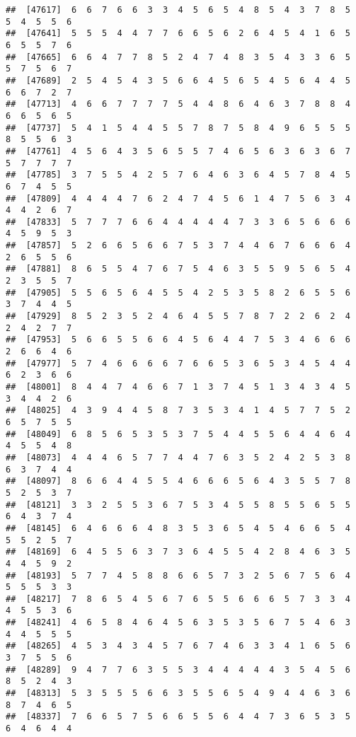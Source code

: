 \documentclass[
]{book}
\begin{document}
\begin{verbatim}
##  [47617]  6  6  7  6  6  3  3  4  5  6  5  4  8  5  4  3  7  8  5  5  4  5  5  6
##  [47641]  5  5  5  4  4  7  7  6  6  5  6  2  6  4  5  4  1  6  5  6  5  5  7  6
##  [47665]  6  6  4  7  7  8  5  2  4  7  4  8  3  5  4  3  3  6  5  5  7  5  6  7
##  [47689]  2  5  4  5  4  3  5  6  6  4  5  6  5  4  5  6  4  4  5  6  6  7  2  7
##  [47713]  4  6  6  7  7  7  7  5  4  4  8  6  4  6  3  7  8  8  4  6  6  5  6  5
##  [47737]  5  4  1  5  4  4  5  5  7  8  7  5  8  4  9  6  5  5  5  8  5  5  6  3
##  [47761]  4  5  6  4  3  5  6  5  5  7  4  6  5  6  3  6  3  6  7  5  7  7  7  7
##  [47785]  3  7  5  5  4  2  5  7  6  4  6  3  6  4  5  7  8  4  5  6  7  4  5  5
##  [47809]  4  4  4  4  7  6  2  4  7  4  5  6  1  4  7  5  6  3  4  4  4  2  6  7
##  [47833]  5  7  7  7  6  6  4  4  4  4  4  7  3  3  6  5  6  6  6  4  5  9  5  3
##  [47857]  5  2  6  6  5  6  6  7  5  3  7  4  4  6  7  6  6  6  4  2  6  5  5  6
##  [47881]  8  6  5  5  4  7  6  7  5  4  6  3  5  5  9  5  6  5  4  2  3  5  5  7
##  [47905]  5  5  6  5  6  4  5  5  4  2  5  3  5  8  2  6  5  5  6  3  7  4  4  5
##  [47929]  8  5  2  3  5  2  4  6  4  5  5  7  8  7  2  2  6  2  4  2  4  2  7  7
##  [47953]  5  6  6  5  5  6  6  4  5  6  4  4  7  5  3  4  6  6  6  2  6  6  4  6
##  [47977]  5  7  4  6  6  6  6  7  6  6  5  3  6  5  3  4  5  4  4  6  2  3  6  6
##  [48001]  8  4  4  7  4  6  6  7  1  3  7  4  5  1  3  4  3  4  5  3  4  4  2  6
##  [48025]  4  3  9  4  4  5  8  7  3  5  3  4  1  4  5  7  7  5  2  6  5  7  5  5
##  [48049]  6  8  5  6  5  3  5  3  7  5  4  4  5  5  6  4  4  6  4  4  5  5  4  8
##  [48073]  4  4  4  6  5  7  7  4  4  7  6  3  5  2  4  2  5  3  8  6  3  7  4  4
##  [48097]  8  6  6  4  4  5  5  4  6  6  6  5  6  4  3  5  5  7  8  5  2  5  3  7
##  [48121]  3  3  2  5  5  3  6  7  5  3  4  5  5  8  5  5  6  5  5  6  4  3  7  4
##  [48145]  6  4  6  6  6  4  8  3  5  3  6  5  4  5  4  6  6  5  4  5  5  2  5  7
##  [48169]  6  4  5  5  6  3  7  3  6  4  5  5  4  2  8  4  6  3  5  4  4  5  9  2
##  [48193]  5  7  7  4  5  8  8  6  6  5  7  3  2  5  6  7  5  6  4  5  5  5  3  3
##  [48217]  7  8  6  5  4  5  6  7  6  5  5  6  6  6  5  7  3  3  4  4  5  5  3  6
##  [48241]  4  6  5  8  4  6  4  5  6  3  5  3  5  6  7  5  4  6  3  4  4  5  5  5
##  [48265]  4  5  3  4  3  4  5  7  6  7  4  6  3  3  4  1  6  5  6  3  7  5  5  6
##  [48289]  9  4  7  7  6  3  5  5  3  4  4  4  4  4  3  5  4  5  6  8  5  2  4  3
##  [48313]  5  3  5  5  5  6  6  3  5  5  6  5  4  9  4  4  6  3  6  8  7  4  6  5
##  [48337]  7  6  6  5  7  5  6  6  5  5  6  4  4  7  3  6  5  3  5  6  4  6  4  4

\end{verbatim}
\end{document}
